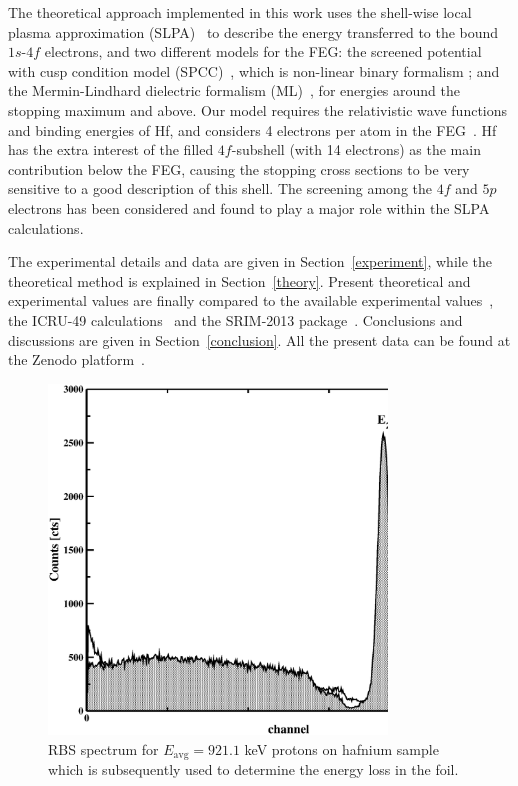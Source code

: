\documentclass[aps,pra,reprint,groupedaddress]{revtex4-1}
\begin{document}
The theoretical approach implemented in this work uses the shell-wise local plasma approximation (SLPA)~\cite{mon13} to describe the energy transferred to the bound $1s$-$4f$ electrons, and two different models for the FEG: the screened potential with cusp condition model (SPCC)~\cite{mon17}, which is non-linear binary formalism%
; and the Mermin-Lindhard dielectric formalism (ML)~\cite{Mermin}, for energies around the stopping maximum and above. Our model requires 
the relativistic wave functions and binding energies of Hf, and considers 4 electrons per atom in the FEG~\cite{mendez2019}. 
Hf has the extra interest of the filled $4f$-subshell (with 14 electrons) as the main contribution below the FEG, causing the stopping cross sections to be very sensitive to a good description of this shell. The screening among the $4f$ and $5p$ electrons has been considered and found to play a major role within the SLPA calculations.

The experimental details and data are given in Section~\ref{experiment}, while the theoretical method is explained in Section~\ref{theory}. Present theoretical and experimental values are finally compared to the available experimental values~\cite{Sirotinin}, the ICRU-49 calculations~\cite{ICRU49} and the SRIM-2013 package~\cite{Ziegler01}. Conclusions and discussions are given in Section~\ref{conclusion}. All the present data can be found at the Zenodo platform~\cite{zenodo}.




\begin{figure}[!t]
\centering
\includegraphics[width=9cm]{Fig01.eps}
\caption{RBS spectrum for $E_{\mathrm{avg}}=921.1$ keV protons on hafnium sample which is subsequently used to determine the energy loss in the foil.}
\label{F01}
\end{figure}
\end{document}
